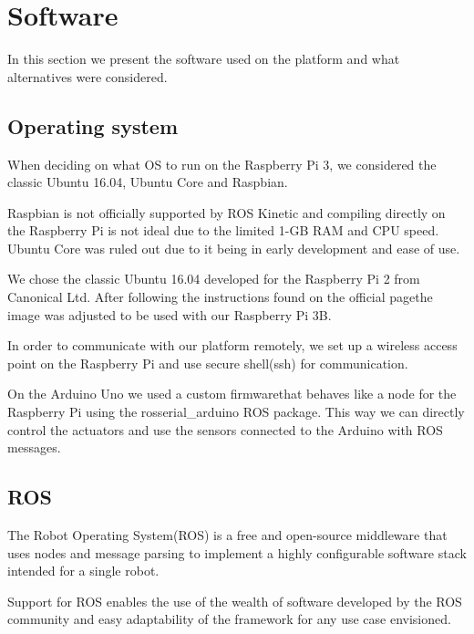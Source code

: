 \documentclass[class=report, crop=false]{standalone}
\begin{document}
\section{Software}\label{sec:software}
In this section we present the software used on the platform and what alternatives were considered.

\subsection{Operating system}\label{subsec:os}
When deciding on what OS to run on the Raspberry Pi 3, we considered the classic Ubuntu 16.04, Ubuntu Core and Raspbian.

Raspbian is not officially supported by ROS Kinetic and compiling directly on the Raspberry Pi is not ideal due to the limited 1-GB RAM and CPU speed. Ubuntu Core was ruled out due to it being in early development and ease of use.

We chose the classic Ubuntu 16.04 developed for the Raspberry Pi 2 from Canonical Ltd. After following the instructions found on the official page\footnotemark the image was adjusted to be used with our Raspberry Pi 3B.

In order to communicate with our platform remotely, we set up a wireless access point on the Raspberry Pi and use secure shell(ssh) for communication.

On the Arduino Uno we used a custom firmware\footnotemark that behaves like a node for the Raspberry Pi using the rosserial\_arduino ROS package. This way we can directly control the actuators and use the sensors connected to the Arduino with ROS messages.


\subsection{ROS}\label{subsec:ros}
The Robot Operating System(ROS) is a free and open-source middleware that uses nodes and message parsing to implement a highly configurable software stack intended for a single robot.

Support for ROS enables the use of the wealth of software developed by the ROS community and easy adaptability of the framework for any use case envisioned.
\end{document}
